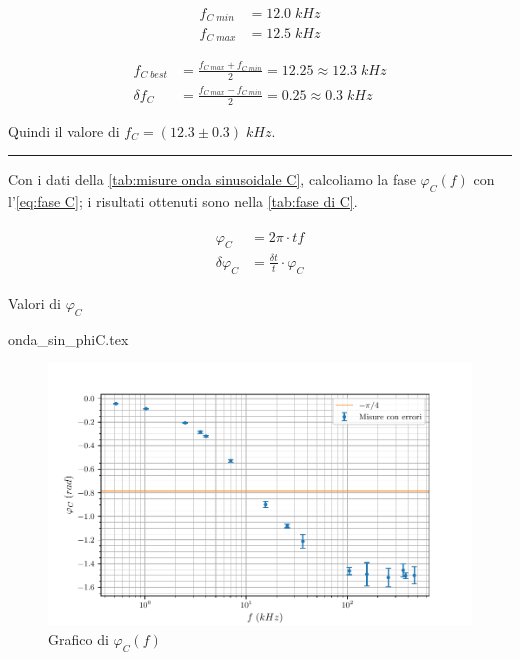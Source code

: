 \documentclass[11pt, a4paper]{article}
\numberwithin{equation}{section} %
\begin{document}
\begin{align*}
    f_{C \; min} &= 12.0 \; kHz \\
    f_{C \; max} &= 12.5 \; kHz
\end{align*}

\begin{align*}
    f_{C \; best} &= \frac{f_{C \; max} + f_{C \; min}}{2} = 12.25 \approx 12.3 \; kHz \\
    \delta f_{C} &= \frac{f_{C \; max} - f_{C \; min}}{2} = 0.25 \approx 0.3 \; kHz
\end{align*}

Quindi il valore di \(f_{C} = (12.3 \pm 0.3) \; kHz\).

\rule{\textwidth}{1pt}

Con i dati della \autoref{tab:misure onda sinusoidale C}, calcoliamo la fase $\varphi_{C}(f)$ con l'\autoref{eq:fase C}; i risultati ottenuti sono nella \autoref{tab:fase di C}.

\begin{align} \label{eq:fase C}
    \begin{split}
        \varphi_{C} &= 2\pi \cdot tf \\
        \delta \varphi_{C} &= \frac{\delta t}{t} \cdot \varphi_{C}
    \end{split}
\end{align}

\begin{table}[ht!]
    \centering
    \caption{Valori di $\varphi_{C}$}
    {onda_sin_phiC.tex}
    \label{tab:fase di C}
\end{table}


\begin{figure}[ht!]
    \includegraphics{onda_sin_phi(f)_C.pdf}
    \caption{Grafico di $\varphi_{C}(f)$}
    \label{fig:fase C}
\end{figure}
\end{document}
